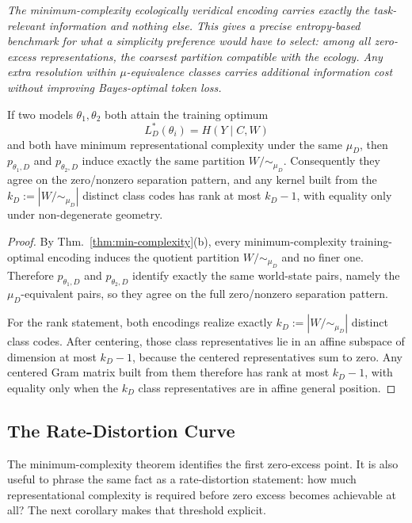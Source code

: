 \documentclass[twoside,11pt]{article}
\newenvironment{interpretation}{\par\noindent{\bf Interpretation.}\itshape}{\par}
\newcommand{\thmref}[1]{Thm.~\ref{#1}}
\begin{document}
\begin{interpretation}
The minimum-complexity ecologically veridical encoding carries exactly the task-relevant information and nothing else. This gives a precise entropy-based benchmark for what a simplicity preference would have to select: among all zero-excess representations, the coarsest partition compatible with the ecology. Any extra resolution within $\mu$-equivalence classes carries additional information cost without improving Bayes-optimal token loss.
\end{interpretation}

\begin{corollary}\label{cor:topological-convergence}
If two models $\theta_1, \theta_2$ both attain the training optimum
\[
L_D^*(\theta_i) = H(Y \mid C,W)
\]
and both have minimum representational complexity under the same $\mu_D$, then $p_{\theta_1,D}$ and $p_{\theta_2,D}$ induce exactly the same partition $W/{\sim_{\mu_D}}$. Consequently they agree on the zero/nonzero separation pattern, and any kernel built from the $k_D := |W/{\sim_{\mu_D}}|$ distinct class codes has rank at most $k_D-1$, with equality only under non-degenerate geometry.
\end{corollary}

\begin{proof}
By \thmref{thm:min-complexity}(b), every minimum-complexity training-optimal encoding induces the quotient partition $W/{\sim_{\mu_D}}$ and no finer one. Therefore $p_{\theta_1,D}$ and $p_{\theta_2,D}$ identify exactly the same world-state pairs, namely the $\mu_D$-equivalent pairs, so they agree on the full zero/nonzero separation pattern.

For the rank statement, both encodings realize exactly $k_D:=|W/{\sim_{\mu_D}}|$ distinct class codes. After centering, those class representatives lie in an affine subspace of dimension at most $k_D-1$, because the centered representatives sum to zero. Any centered Gram matrix built from them therefore has rank at most $k_D-1$, with equality only when the $k_D$ class representatives are in affine general position.
\end{proof}

\subsection{The Rate-Distortion Curve}

The minimum-complexity theorem identifies the first zero-excess point. It is also useful to phrase the same fact as a rate-distortion statement: how much representational complexity is required before zero excess becomes achievable at all? The next corollary makes that threshold explicit.
\end{document}

